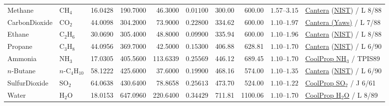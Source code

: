 \documentclass[10pt,a4paper]{article}
\begin{document}
\begin{table}[ht!]
{\begin{tabular}{llrrrrrrll}
Methane & $\mathrm{CH_4}$ & 16.0428 & 190.7000 & 46.3000 & $0.01100$ & 300.00 & 600.00 & $1.57\text{--}3.15$ & \href{https://github.com/Cantera/cantera/blob/v3.2.0/data/critical-properties.yaml}{Cantera} (\href{https://doi.org/10.18434/T4D303}{NIST}) / L 8/88 \\
CarbonDioxide & $\mathrm{CO_2}$ & 44.0098 & 304.2000 & 73.9000 & $0.22800$ & 334.62 & 600.00 & $1.10\text{--}1.97$ & \href{https://github.com/Cantera/cantera/blob/v3.2.0/data/critical-properties.yaml}{Cantera (Yaws)} / L 7/88 \\
Ethane & $\mathrm{C_2H_6}$ & 30.0690 & 305.4000 & 48.8000 & $0.09900$ & 335.94 & 600.00 & $1.10\text{--}1.96$ & \href{https://github.com/Cantera/cantera/blob/v3.2.0/data/critical-properties.yaml}{Cantera} (\href{https://doi.org/10.18434/T4D303}{NIST}) / L 8/88 \\
Propane & $\mathrm{C_3H_8}$ & 44.0956 & 369.7000 & 42.5000 & $0.15300$ & 406.88 & 628.81 & $1.10\text{--}1.70$ & \href{https://github.com/Cantera/cantera/blob/v3.2.0/data/critical-properties.yaml}{Cantera} (\href{https://doi.org/10.18434/T4D303}{NIST}) / L 6/90 \\
Ammonia & $\mathrm{NH_3}$ & 17.0305 & 405.5600 & 113.6339 & $0.25569$ & 446.12 & 689.45 & $1.10\text{--}1.70$ & \href{https://coolprop.org/fluid_properties/fluids/Ammonia.html}{CoolProp NH$_3$} / TPIS89 \\
$n$-Butane & $n\text{-}\mathrm{C_4H_{10}}$ & 58.1222 & 425.6000 & 37.6000 & $0.19900$ & 468.16 & 574.00 & $1.10\text{--}1.35$ & \href{https://github.com/Cantera/cantera/blob/v3.2.0/data/critical-properties.yaml}{Cantera} (\href{https://doi.org/10.18434/T4D303}{NIST}) / L 6/90 \\
SulfurDioxide & $\mathrm{SO_2}$ & 64.0638 & 430.6400 & 78.8658 & $0.25613$ & 473.70 & 524.00 & $1.10\text{--}1.22$ & \href{https://coolprop.org/fluid_properties/fluids/SulfurDioxide.html}{CoolProp SO$_2$} / J 6/61 \\
Water & $\mathrm{H_2O}$ & 18.0153 & 647.0960 & 220.6400 & $0.34429$ & 711.81 & 1100.06 & $1.10\text{--}1.70$ & \href{https://coolprop.org/fluid_properties/fluids/Water.html}{CoolProp H$_2$O} / L 8/89 \\
\bottomrule
\end{tabular}}
\end{table}
\end{document}

